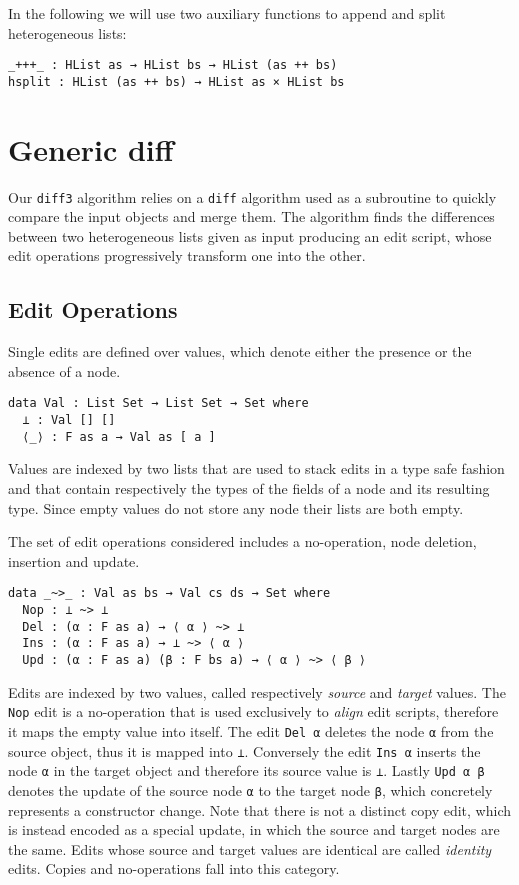 \documentclass[preprint]{sigplanconf}
\begin{document}
	In the following we will use two auxiliary functions to append and split 
	heterogeneous lists:
\begin{verbatim}
_+++_ : HList as → HList bs → HList (as ++ bs)
hsplit : HList (as ++ bs) → HList as × HList bs
\end{verbatim}
	
\section{Generic diff}
	Our \texttt{diff3} algorithm relies on a \texttt{diff} algorithm used 
        as a subroutine to quickly compare the input objects and merge them.
	The algorithm finds the differences between two heterogeneous lists given 
	as input producing an edit script, whose edit operations progressively 
	transform one into the other.

	\subsection{Edit Operations}
	Single edits are defined over values, which denote either the presence or 
	the absence of a node.
\begin{verbatim}
data Val : List Set → List Set → Set where
  ⊥ : Val [] []
  ⟨_⟩ : F as a → Val as [ a ] 
\end{verbatim}
	Values are indexed by two lists that are used to stack edits in a type 
	safe fashion and that contain respectively the types of the fields of a node 
	and its resulting type.
	Since empty values do not store any node their lists are both empty.

	The set of edit operations considered includes a no-operation, node 
	deletion, insertion and update.
\begin{verbatim}
data _~>_ : Val as bs → Val cs ds → Set where
  Nop : ⊥ ~> ⊥
  Del : (α : F as a) → ⟨ α ⟩ ~> ⊥
  Ins : (α : F as a) → ⊥ ~> ⟨ α ⟩
  Upd : (α : F as a) (β : F bs a) → ⟨ α ⟩ ~> ⟨ β ⟩
\end{verbatim}
	Edits are indexed by two values, called respectively 
	\emph{source} and \emph{target} values. The \texttt{Nop} edit is 
	a no-operation that is used exclusively to \emph{align} edit scripts,
	therefore it maps the empty value into itself.
	The edit \texttt{Del α} deletes the node \texttt{α} from the source object, 
	thus it is mapped into \texttt{⊥}. Conversely the edit \texttt{Ins α} 
	inserts the node \texttt{α} in the target object and therefore its source value 
	is 	\texttt{⊥}.
	Lastly \texttt{Upd α β} denotes the update of the source node \texttt{α}
	to the target node \texttt{β}, which concretely represents a 
	constructor change. 
	Note that there is not a distinct copy edit, which is instead encoded as a 
	special	update, in which the source and target nodes are the same.
	Edits whose source and target values are identical are 
	called \emph{identity} edits. Copies and no-operations fall into this
	category.
	
\end{document}
